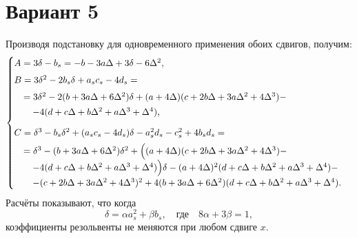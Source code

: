 \documentclass{article}
\begin{document}
\section*{Вариант 5}

Производя подстановку для одновременного применения обоих сдвигов, получим:
\begin{equation}
\begin{cases}
A = 3\delta - b_s = -b - 3a\Delta + 3\delta - 6\Delta^2, \\[4pt]
B = 3\delta^2 - 2b_s\delta + a_s c_s - 4d_s = \\[4pt]
\quad = 3\delta^2 - 2(b + 3a\Delta + 6\Delta^2)\delta + (a + 4\Delta)(c + 2b\Delta + 3a\Delta^2 + 4\Delta^3) - \\[2pt]
\quad \quad - 4(d + c\Delta + b\Delta^2 + a\Delta^3 + \Delta^4), \\[8pt]
C = \delta^3 - b_s\delta^2 + (a_s c_s - 4d_s)\delta - a_s^2 d_s - c_s^2 + 4b_s d_s = \\[4pt]
\quad = \delta^3 - (b + 3a\Delta + 6\Delta^2)\delta^2 + \Bigl((a + 4\Delta)(c + 2b\Delta + 3a\Delta^2 + 4\Delta^3) - \\[2pt]
\quad \quad - 4(d + c\Delta + b\Delta^2 + a\Delta^3 + \Delta^4)\Bigr)\delta - (a + 4\Delta)^2(d + c\Delta + b\Delta^2 + a\Delta^3 + \Delta^4) - \\[2pt]
\quad \quad - (c + 2b\Delta + 3a\Delta^2 + 4\Delta^3)^2 + 4(b + 3a\Delta + 6\Delta^2)(d + c\Delta + b\Delta^2 + a\Delta^3 + \Delta^4).
\end{cases}
\end{equation}
Расчёты показывают, что когда
\begin{equation}
\delta = \alpha a_s^2 + \beta b_s, \quad \text{где} \quad 8\alpha + 3\beta = 1,
\end{equation}
коэффициенты резольвенты не меняются при любом сдвиге $x$.
\end{document}
